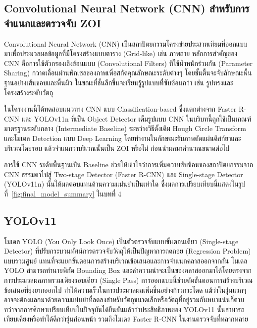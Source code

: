 \subsection{Convolutional Neural Network (CNN) สำหรับการจำแนกและตรวจจับ ZOI}

Convolutional Neural Network (CNN) เป็นสถาปัตยกรรมโครงข่ายประสาทเทียมที่ออกแบบมาเพื่อประมวลผลข้อมูลที่มีโครงสร้างแบบตาราง (Grid-like) เช่น ภาพถ่าย \cite{purwono2023cnn} หลักการสำคัญของ CNN คือการใช้ตัวกรองเชิงข้อนแบบ (Convolutional Filters) ที่ใช้น้ำหนักร่วมกัน (Parameter Sharing) กวาดเลื่อนผ่านพิกเซลของภาพเพื่อสกัดคุณลักษณะระดับต่างๆ โดยชั้นตื้นจะจับลักษณะพื้นฐานอย่างเส้นขอบและพื้นผิว ในขณะที่ชั้นลึกขึ้นจะเรียนรู้รูปแบบที่ซับซ้อนกว่า เช่น รูปทรงและโครงสร้างระดับวัตถุ

ในโครงงานนี้ได้ทดสอบแนวทาง CNN แบบ Classification-based ซึ่งแตกต่างจาก Faster R-CNN และ YOLOv11n ที่เป็น Object Detector เต็มรูปแบบ CNN ในบริบทนี้ถูกใช้เป็นเกณฑ์มาตรฐานระดับกลาง (Intermediate Baseline) ระหว่างวิธีดั้งเดิม Hough Circle Transform และโมเดล Detection แบบ Deep Learning โดยทำงานในลักษณะรับภาพตัดแผ่นดิสก์ยาและบริเวณโดยรอบ แล้วจำแนกว่าบริเวณนั้นเป็น ZOI หรือไม่ ก่อนนำผลมาคำนวณขนาดต่อไป

การใช้ CNN ระดับพื้นฐานเป็น Baseline ช่วยให้เข้าใจว่าการเพิ่มความซับซ้อนของสถาปัตยกรรมจาก CNN ธรรมดาไปสู่ Two-stage Detector (Faster R-CNN) และ Single-stage Detector (YOLOv11n) นั้นให้ผลตอบแทนด้านความแม่นยำเป็นเท่าใด ซึ่งผลการเปรียบเทียบนี้แสดงในรูปที่~\ref{fig:final_model_summary} ในบทที่ 4
\subsection{YOLOv11}

โมเดล YOLO (You Only Look Once) เป็นตัวตรวจจับแบบขั้นตอนเดียว (Single-stage Detector) ที่ปรับกระบวนทัศน์การตรวจจับวัตถุให้เป็นปัญหาการถดถอย (Regression Problem) แบบรวมศูนย์ แทนที่จะแยกขั้นตอนการสร้างบริเวณข้อเสนอและการจำแนกคลาสออกจากกัน โมเดล YOLO สามารถทำนายพิกัด Bounding Box และค่าความน่าจะเป็นของคลาสออกมาได้โดยตรงจากการประมวลผลภาพรวมเพียงรอบเดียว (Single Pass) \cite{wang2024yolov11,khanam2024yolov11} การออกแบบนี้ช่วยตัดขั้นตอนการสร้างบริเวณข้อเสนอที่ยุ่งยากออกไป ทำให้ความเร็วในการประมวลผลเพิ่มขึ้นอย่างก้าวกระโดด แม้ว่าในรุ่นแรกๆ อาจจะต้องแลกมาด้วยความแม่นยำที่ลดลงสำหรับวัตถุขนาดเล็กหรือวัตถุที่อยู่รวมกันหนาแน่นก็ตาม ทว่าจากการศึกษาเปรียบเทียบในปัจจุบันได้ยืนยันแล้วว่าประสิทธิภาพของ YOLOv11 นั้นสามารถเทียบเคียงหรือทำได้ดีกว่ารุ่นก่อนหน้า รวมถึงโมเดล Faster R-CNN ในงานตรวจจับที่หลากหลาย \cite{sharma2024yolo_comparison}



